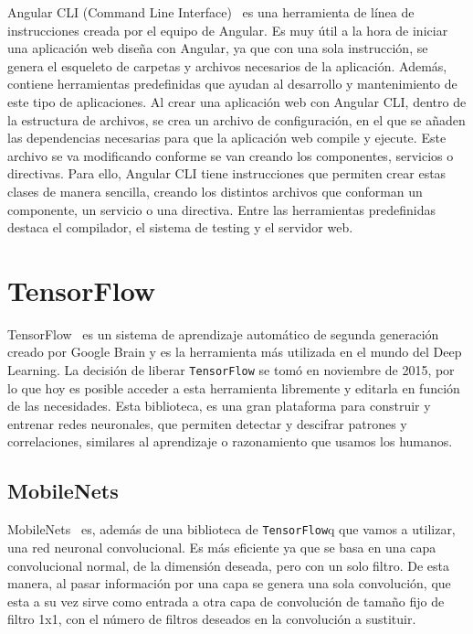 \documentclass[a4paper, 12pt]{book}
\begin{document}
Angular CLI (Command Line Interface)~\cite{articulobayes} es una herramienta de línea de instrucciones creada por el equipo de Angular. Es muy útil a la hora de iniciar una aplicación web diseña con Angular, ya que con una sola instrucción, se genera el esqueleto de carpetas y archivos necesarios de la aplicación. Además, contiene herramientas predefinidas que ayudan al desarrollo y mantenimiento de este tipo de aplicaciones. Al crear una aplicación web con Angular CLI, dentro de la estructura de archivos, se crea un archivo de configuración, en el que se añaden las dependencias necesarias para que la aplicación web compile y ejecute. Este archivo se va modificando conforme se van creando los componentes, servicios o directivas. Para ello, Angular CLI tiene instrucciones que permiten crear estas clases de manera sencilla, creando los distintos archivos que conforman un componente, un servicio o una directiva. Entre las herramientas predefinidas destaca el compilador, el sistema de testing y el servidor web.

\section{TensorFlow} 
\label{sec:tensorflow}

TensorFlow~\cite{tensorflow} es un sistema de aprendizaje automático de segunda generación creado por Google Brain y es la herramienta más utilizada en el mundo del Deep Learning. La decisión de liberar \texttt{TensorFlow} se tomó en noviembre de 2015, por lo que hoy es posible acceder a esta herramienta libremente y editarla en función de las necesidades. Esta biblioteca, es una gran plataforma para construir y entrenar redes neuronales, que permiten detectar y descifrar patrones y correlaciones, similares al aprendizaje o razonamiento que usamos los humanos. 

\subsection{MobileNets} 
\label{sec:mobilenets}

MobileNets~\cite{mobilenets} es, además de una biblioteca de \texttt{TensorFlow}q que vamos a utilizar, una red neuronal convolucional. Es más eficiente ya que se basa en una capa convolucional normal, de la dimensión deseada, pero con un solo filtro. De esta manera, al pasar información por una capa se genera una sola convolución, que esta a su vez sirve como entrada a otra capa de convolución de tamaño fijo de filtro 1x1, con el número de filtros deseados en la convolución a sustituir.
\end{document}
